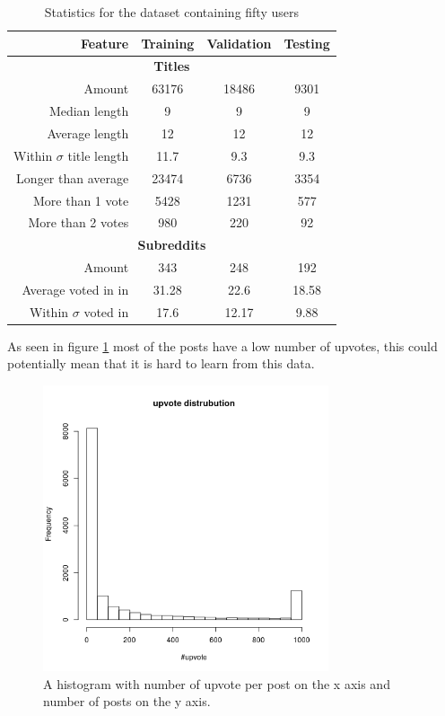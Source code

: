 \begin{table}[H]
    \centering
    \begin{tabular}{ r | c | c | c }
    \hline
    \textbf{Feature} & \textbf{Training} & \textbf{Validation} & \textbf{Testing} \\ \hline \hline
    \multicolumn{4}{c}{\textbf{Titles}} \\ \hline \hline
    Amount & 63176 & 18486 & 9301 \\ \hline
    Median length & 9 & 9 & 9 \\ \hline
    Average length & 12 & 12 & 12  \\ \hline
    Within $\sigma$ title length & 11.7 & 9.3 & 9.3 \\ \hline
    Longer than average & 23474 & 6736 & 3354 \\ \hline
    More than 1 vote & 5428 & 1231 & 577 \\ \hline
    More than 2 votes & 980 & 220 & 92\\ \hline \hline
    \multicolumn{4}{c}{\textbf{Subreddits}} \\ \hline \hline
    Amount & 343 & 248 & 192  \\ \hline
    Average voted in in & 31.28 & 22.6 & 18.58 \\ \hline
    Within $\sigma$ voted in & 17.6 & 12.17 & 9.88  \\ \hline
    \end{tabular}
    \caption{Statistics for the dataset containing fifty users}
    \label{table:50-user-set-train}
\end{table}


As seen in figure \ref{fig:histvotes} most of the posts have a low number of upvotes, this could potentially mean that it is hard to learn from this data.

\begin{figure}[H]
    \centering
    \includegraphics[width=0.75\textwidth]{figure/results/histupvote}
    \caption{A histogram with number of upvote per post on the x axis and number of posts on the y axis.}
    \label{fig:histvotes}
\end{figure}


